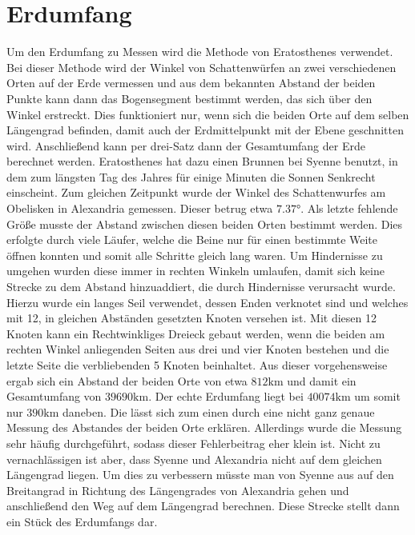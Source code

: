 \documentclass[12pt,a4paper,titlepage,headinclude]{scrartcl}
\numberwithin{equation}{subsection}
\begin{document}
\section{Erdumfang}
Um den Erdumfang zu Messen wird die Methode von Eratosthenes verwendet.
Bei dieser Methode wird der Winkel von Schattenwürfen an zwei verschiedenen Orten auf der Erde vermessen und aus dem bekannten Abstand der beiden Punkte kann dann das Bogensegment bestimmt werden, das sich über den Winkel erstreckt.
Dies funktioniert nur, wenn sich die beiden Orte auf dem selben Längengrad befinden, damit auch der Erdmittelpunkt mit der Ebene geschnitten wird.
Anschließend kann per drei-Satz dann der Gesamtumfang der Erde berechnet werden.
Eratosthenes hat dazu einen Brunnen bei Syenne benutzt, in dem zum längsten Tag des Jahres für einige Minuten die Sonnen Senkrecht einscheint.
Zum gleichen Zeitpunkt wurde der Winkel des Schattenwurfes am Obelisken in Alexandria gemessen.
Dieser betrug etwa $7.37\si{\degree}$.
Als letzte fehlende Größe musste der Abstand zwischen diesen beiden Orten bestimmt werden.
Dies erfolgte durch viele Läufer, welche die Beine nur für einen bestimmte Weite öffnen konnten und somit alle Schritte gleich lang waren.
Um Hindernisse zu umgehen wurden diese immer in rechten Winkeln umlaufen, damit sich keine Strecke zu dem Abstand hinzuaddiert, die durch Hindernisse verursacht wurde.
Hierzu wurde ein langes Seil verwendet, dessen Enden verknotet sind und welches mit 12, in gleichen Abständen gesetzten Knoten versehen ist.
Mit diesen 12 Knoten kann ein Rechtwinkliges Dreieck gebaut werden, wenn die beiden am rechten Winkel anliegenden Seiten aus drei und vier Knoten bestehen und die letzte Seite die verbliebenden 5 Knoten beinhaltet.
Aus dieser vorgehensweise ergab sich ein Abstand der beiden Orte von etwa $812\si{\kilo\meter}$ und damit ein Gesamtumfang von $39690\si{\kilo\meter}$.
Der echte Erdumfang liegt bei $40074\si{\kilo\meter}$ um somit nur $390\si{\kilo\meter}$ daneben.
Die lässt sich zum einen durch eine nicht ganz genaue Messung des Abstandes der beiden Orte erklären.
Allerdings wurde die Messung sehr häufig durchgeführt, sodass dieser Fehlerbeitrag eher klein ist.
Nicht zu vernachlässigen ist aber, dass Syenne und Alexandria nicht auf dem gleichen Längengrad liegen.
Um dies zu verbessern müsste man von Syenne aus auf den Breitangrad in Richtung des Längengrades von Alexandria gehen und anschließend den Weg auf dem Längengrad berechnen.
Diese Strecke stellt dann ein Stück des Erdumfangs dar.


\newpage
\printbibliography[heading=bibintoc]
\end{document}
